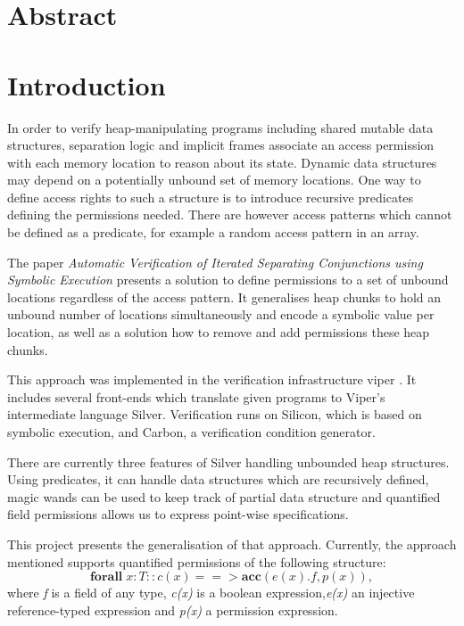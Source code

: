 \documentclass[12pt]{article}
\begin{document}
\maketitle
\newpage
\tableofcontents
\newpage
\section{Abstract}
\section{Introduction}
In order to verify heap-manipulating programs including shared mutable data structures, separation logic\cite{reynolds2002separation} and implicit frames\cite{smans2009implicit} associate an access permission with each memory location to reason about its state. 
Dynamic data structures may depend on a potentially unbound set of memory locations. One way to define access rights to such a structure is to introduce recursive predicates defining the permissions needed. There are however access patterns which cannot be defined as a predicate, for example a random access pattern in an array.

The paper \textit{Automatic Verification of Iterated Separating Conjunctions using Symbolic Execution}\cite{isc} presents a solution to define permissions to a set of unbound locations regardless of the access pattern. It generalises heap chunks to hold an unbound number of locations simultaneously and encode a symbolic value per location, as well as a solution how to remove and add permissions these heap chunks.

This approach was implemented in the verification infrastructure viper \cite{viper}. It includes several front-ends which translate given programs to Viper's intermediate language Silver. Verification runs on Silicon, which is based on symbolic execution, and Carbon, a verification condition generator.

There are currently three features of Silver handling unbounded heap structures. Using predicates, it can handle data structures which are recursively defined, magic wands \cite{magicwand} can be used to keep track of partial data structure and quantified field permissions \cite{isc} allows us to express point-wise specifications. 

This project presents the generalisation of that approach. Currently, the approach mentioned supports quantified permissions of the following structure:
\begin{equation}
	\mathbf{forall} \; x:T :: c(x) ==>\mathbf{acc}( e(x).f, p(x) ) ,
\end{equation}
where {\it f} is a field of any type, {\it c(x)} is  a boolean expression,{\it e(x)} an injective reference-typed expression and {\it p(x)} a permission expression.
\end{document}
